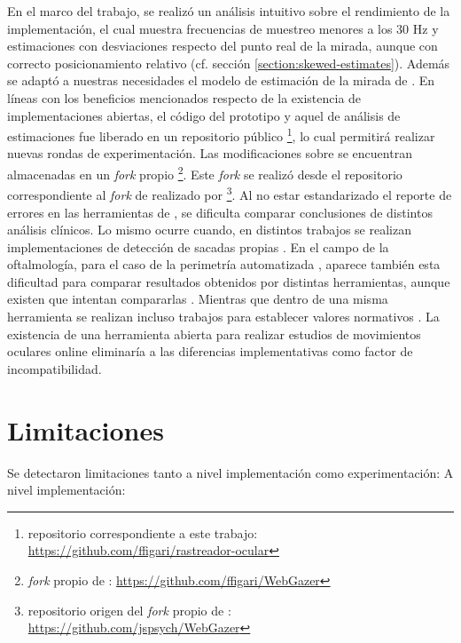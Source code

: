 En el marco del trabajo, se realizó un análisis intuitivo sobre el rendimiento
de la implementación, el cual muestra frecuencias de muestreo menores a los 30
Hz y estimaciones con desviaciones respecto del punto real de la mirada, aunque
con correcto posicionamiento relativo (cf. sección
\ref{section:skewed-estimates}).
Además se adaptó a nuestras necesidades el modelo de estimación de la mirada de
\webgazer.
En líneas con los beneficios mencionados respecto de la existencia de
implementaciones abiertas, el código del prototipo y aquel de análisis de
estimaciones fue liberado en un repositorio público \footnote{repositorio
correspondiente a este trabajo:
\url{https://github.com/ffigari/rastreador-ocular}}, lo cual permitirá
realizar nuevas rondas de experimentación.
Las modificaciones sobre \webgazer se encuentran almacenadas en un
\textit{fork} propio \footnote{\textit{fork} propio de \webgazer:
\url{https://github.com/ffigari/WebGazer}}.
Este \textit{fork} se realizó desde el repositorio correspondiente al
\textit{fork} de \webgazer realizado por \jspsych \footnote{repositorio origen
del \textit{fork} propio de \webgazer:
\url{https://github.com/jspsych/WebGazer}}.
Al no estar estandarizado el reporte de errores en las herramientas de
\eyetracking \cite{zandi_2021_pupilext}, se dificulta comparar conclusiones de
distintos análisis clínicos.
Lo mismo ocurre cuando, en distintos trabajos se realizan implementaciones de
detección de sacadas propias \cite{salvucci_2000_identifying_fixations}.
En el campo de la oftalmología, para el caso de la perimetría automatizada
\cite{pubmed_1996_automated_perimetry}, aparece también esta dificultad para
comparar resultados obtenidos por distintas herramientas, aunque existen que
intentan compararlas \cite{landers_2007_automated_perimeters_comparison}.
Mientras que dentro de una misma herramienta se realizan incluso trabajos para
establecer valores normativos \cite{brenton_1986_humphrey_normal_visual_field}.
La existencia de una herramienta abierta para realizar estudios de movimientos
oculares online eliminaría a las diferencias implementativas como factor de
incompatibilidad.

\section{Limitaciones}

Se detectaron limitaciones tanto a nivel implementación como experimentación:
A nivel implementación: 

